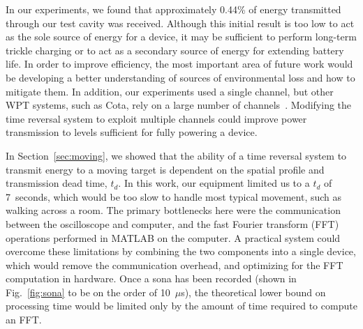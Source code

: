 In our experiments, we found that approximately 0.44\% of energy transmitted
through our test cavity was received.
%
Although this initial result is too low to act as the sole source of energy for
a device, it may be sufficient to perform long-term trickle charging or to act
as a secondary source of energy for extending battery life.
%
In order to improve efficiency, the most important area of future work would be
developing a better understanding of sources of environmental loss and how to
mitigate them.
%
In addition, our experiments used a single channel, but other WPT systems, such
as Cota, rely on a large number of channels~\cite{cota}.
%
Modifying the time reversal system to exploit multiple channels could improve
power transmission to levels sufficient for fully powering a device.



In Section~\ref{sec:moving}, we showed that the ability of a time reversal system
to transmit energy to a moving target is dependent on the spatial profile and
transmission dead time, $t_{d}$.
%
In this work, our equipment limited us to a $t_d$ of 7~seconds, which would be too slow
to handle most typical movement, such as walking across a room.
%
The primary bottlenecks here were the communication between the oscilloscope
and computer, and the fast Fourier transform (FFT) operations performed in MATLAB
on the computer.
%
A practical system could overcome these limitations by combining the two components
into a single device, which would remove the communication overhead, and optimizing for
the FFT computation in hardware.
%
Once a sona has been recorded (shown in Fig.~\ref{fig:sona} to be on the order of 10~$\mu$s),
the theoretical lower bound on processing time would be limited only by the amount of
time required to compute an FFT.


